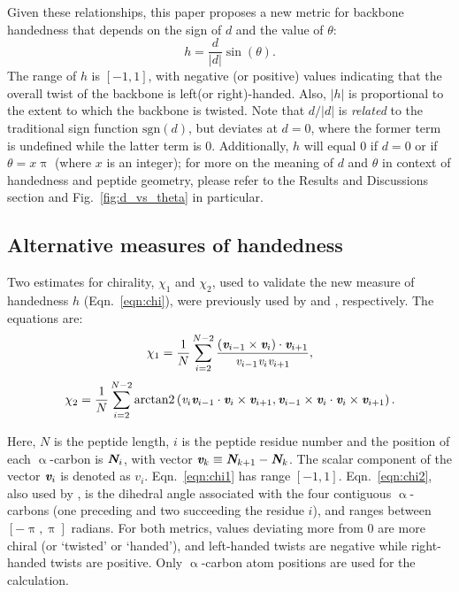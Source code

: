\documentclass[fleqn,10pt,lineno]{wlpeerj} %
\newcommand{\n}[1]{{\color{black}#1}} %
\newcommand{\Fig}[1]{Fig.~\ref{#1}}
\newcommand{\Eqn}[1]{Eqn.~\ref{#1}}
\newcommand{\h}{h}
\begin{document}
\n{Given these relationships, this paper proposes a new} metric for backbone handedness that depends on the sign of $d$ and the value of $\theta$:
\begin{equation}\label{eqn:chi}
\h = \frac{d}{\lvert d \rvert} \sin(\theta).
\end{equation}
\n{The range of $\h$ is $[-1,1]$, with negative (or positive) values indicating that the overall twist of the backbone is left(or right)-handed. Also, $|h|$ is proportional to the extent to which the backbone is twisted.} Note that $d/\lvert d \rvert$ is {\em related} to the traditional sign function $\textrm{sgn}(d)$, but deviates at $d=0$, where the former term is undefined while the latter term is 0. Additionally, $\h$ will equal 0 if $d=0$ or if $\theta=x\uppi$ (where $x$ is an integer); for more on the meaning of $d$ and $\theta$ in context of handedness and peptide geometry, please refer to the Results and Discussions section and \Fig{fig:d_vs_theta} in particular. 

\subsection*{Alternative measures of handedness} 

Two estimates for chirality, $\chi_1$ and $\chi_2$, used to validate the new measure of handedness $\h$ (\Eqn{eqn:chi}), were previously used by \cite{Kwiecinska2005} and \cite{Kabsch1983}, respectively. The equations are: 
\begin{equation} \label{eqn:chi1}
\chi_1 = \frac{1}{N}\sum_{i = 2}^{N-2} \frac{(\textit{\textbf{v}}_{i-1} \times \textit{\textbf{v}}_{i})\cdot \textit{\textbf{v}}_{i+1}}{\textit{v}_{i-1} \textit{v}_{i} \textit{v}_{i+1}},
\end{equation}
\begin{equation}\label{eqn:chi2}
\displaystyle \chi_2 = \frac{1}{N}\sum_{i = 2}^{N-2}
 \textrm{arctan2}\left (\textit{v}_i \textit{\textbf{v}}_{i-1} \cdot \textit{\textbf{v}}_i \times \textit{\textbf{v}}_{i+1},\textit{\textbf{v}}_{i-1}\times \textit{\textbf{v}}_i \cdot \textit{\textbf{v}}_i\times \textit{\textbf{v}}_{i+1} \right ).
\end{equation}

Here, $N$ is the peptide length, $i$ is the peptide residue number and the position of each $\upalpha$-carbon is $\textit{\textbf{N}}_i$, with vector $\textit{\textbf{v}}_{k} \equiv \textit{\textbf{N}}_{k+1} - \textit{\textbf{N}}_{k}$. 
The scalar component of the vector $\textit{\textbf{v}}_i$ is denoted as $\textit{v}_i$. 
\Eqn{eqn:chi1} has range $[-1,1]$. \Eqn{eqn:chi2}, also used by \cite{Gruziel2013}, is the dihedral angle associated with the four contiguous $\upalpha$-carbons (one preceding and two succeeding the residue $i$), and ranges between $[-\uppi,\uppi]$ radians. For both metrics, values  deviating more from 0 are more chiral (or `twisted' or `handed'), and left-handed twists are negative while right-handed twists are positive. Only $
\upalpha$-carbon atom positions are used for the calculation. 
\end{document}
